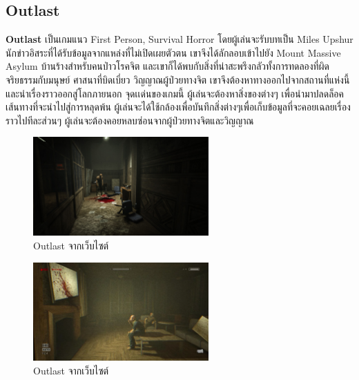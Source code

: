 \subsection{Outlast}
\subsubitem \textbf{Outlast} \cite{outlast:theory} เป็นเกมแนว First Person, Survival Horror โดยผู้เล่นจะรับบทเป็น Miles Upshur นักข่าวอิสระที่ได้รับข้อมูลจากแหล่งที่ไม่เปิดเผยตัวตน เขาจึงได้ลักลอบเข้าไปยัง Mount Massive Asylum บ้านร้างสำหรับคนป่าวโรคจิต และเขาก็ได้พบกับสิ่งที่น่าสะพรึงกลัวทั้งการทดลองที่ผิดจริยธรรมกับมนุษย์ ศาสนาที่บิดเบี่ยว วิญญาณผู้ป่วยทางจิต เขาจึงต้องหาทางออกไปจากสถานที่แห่งนี้ และนำเรื่องราวออกสู่โลกภายนอก จุดเเด่นของเกมนี้ ผู้เล่นจะต้องหาสิ่งของต่างๆ เพื่อนำมาปลดล็อคเส้นทางที่จะนำไปสู่การหลุดพ้น ผู้เล่นจะได้ใช้กล้องเพื่อบันทึกสิ่งต่างๆเพื่อเก็บข้อมูลที่จะคอยเฉลยเรื่องราวไปทีละส่วนๆ ผู้เล่นจะต้องคอยหลบซ่อนจากผู้ป่วยทางจิตและวิญญาณ
\begin{figure}[h]
  \centering
  \includegraphics[width=0.6\textwidth, height=0.2\textheight]{Images/OutlastScreenShot-04-1920x1080.jpg}
  \caption{Outlast จากเว็บไซต์}\label{OutlastScreenShot1}
\end{figure}

\begin{figure}[h]
  \centering
  \includegraphics[width=0.6\textwidth, height=0.2\textheight]{Images/Screenshot 2023-10-06 151547.png}
  \caption{Outlast จากเว็บไซต์}\label{OutlastScreenShot2}
\end{figure}

